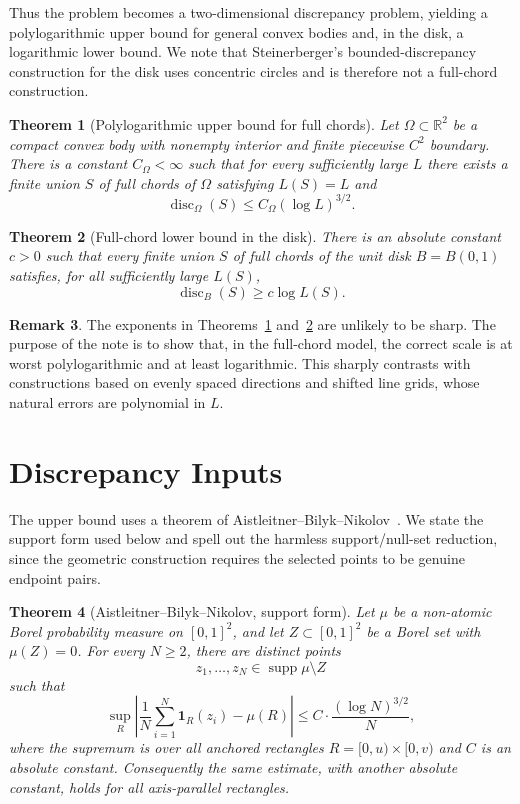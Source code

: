 \documentclass[11pt]{article}
\newtheorem{theorem}{Theorem}[section]
\theoremstyle{definition}
\newtheorem{remark}[theorem]{Remark}
\newcommand{\R}{\mathbb R}
\newcommand{\disc}{\operatorname{disc}}
\newcommand{\supp}{\operatorname{supp}}
\begin{document}
\bigskip
\noindent
Thus the problem becomes a two-dimensional discrepancy problem, yielding a polylogarithmic upper bound for general convex bodies and, in the disk, a logarithmic lower bound. We note that Steinerberger's bounded-discrepancy construction for the disk uses concentric circles and is therefore not a full-chord construction.

\begin{theorem}[Polylogarithmic upper bound for full chords]\label{thm:upper}
Let $\Omega\subset\R^2$ be a compact convex body with nonempty interior and finite piecewise $C^2$ boundary.  There is a constant $C_\Omega<\infty$ such that for every sufficiently large $L$ there exists a finite union $S$ of full chords of $\Omega$ satisfying $L(S)=L$ and
\[
        \disc_\Omega(S)
        \le C_\Omega(\log L)^{3/2}.
\]
\end{theorem}

\begin{theorem}[Full-chord lower bound in the disk]\label{thm:lower}
There is an absolute constant $c>0$ such that every finite union $S$ of full chords of the unit disk $B=B(0,1)$ satisfies, for all sufficiently large $L(S)$,
\[
        \disc_B(S)\ge c\log L(S).
\]
\end{theorem}

\begin{remark}
The exponents in Theorems~\ref{thm:upper} and~\ref{thm:lower} are unlikely to be sharp.  The purpose of the note is to show that, in the full-chord model, the correct scale is at worst polylogarithmic and at least logarithmic.  This sharply contrasts with constructions based on evenly spaced directions and shifted line grids, whose natural errors are polynomial in $L$.
\end{remark}

\section{Discrepancy Inputs}

The upper bound uses a theorem of Aistleitner--Bilyk--Nikolov~\cite{AistleitnerBilykNikolov}.  We state the support form used below and spell out the harmless support/null-set reduction, since the geometric construction requires the selected points to be genuine endpoint pairs.

\begin{theorem}[Aistleitner--Bilyk--Nikolov, support form]\label{thm:ABN}
Let $\mu$ be a non-atomic Borel probability measure on $[0,1]^2$, and let $Z\subset[0,1]^2$ be a Borel set with $\mu(Z)=0$.  For every $N\ge2$, there are distinct points
\[
        z_1,\dots,z_N\in \supp\mu\setminus Z
\]
such that
\[
        \sup_R\left|\frac1N\sum_{i=1}^N\mathbf 1_R(z_i)-\mu(R)\right|
        \le C\cdot\frac{(\log N)^{3/2}}{N},
\]
where the supremum is over all anchored rectangles $R=[0,u)\times[0,v)$ and $C$ is an absolute constant.  Consequently the same estimate, with another absolute constant, holds for all axis-parallel rectangles.
\end{theorem}
\end{document}
